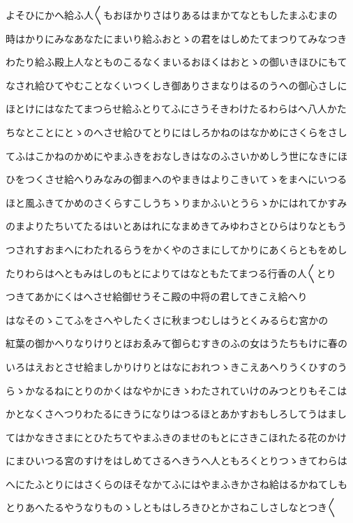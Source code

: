 \documentclass[a4paper,11pt,landscape]{ltjtarticle}
\begin{document}
よそひにかへ給ふ人〱もおほかりさはりあるはまかてなともしたまふむまの
\par\medskip
時はかりにみなあなたにまいり給ふおとゝの君をはしめたてまつりてみなつき
\par\medskip
わたり給ふ殿上人なとものこるなくまいるおほくはおとゝの御いきほひにもて
\par\medskip
なされ給ひてやむことなくいつくしき御ありさまなりはるのうへの御心さしに
\par\medskip
ほとけにはなたてまつらせ給ふとりてふにさうそきわけたるわらはへ八人かた
\par\medskip
ちなとことにとゝのへさせ給ひてとりにはしろかねのはなかめにさくらをさし
\par\medskip
てふはこかねのかめにやまふきをおなしきはなのふさいかめしう世になきにほ
\par\medskip
ひをつくさせ給へりみなみの御まへのやまきはよりこきいてゝをまへにいつる
\par\medskip
ほと風ふきてかめのさくらすこしうちゝりまかふいとうらゝかにはれてかすみ
\par\medskip
のまよりたちいてたるはいとあはれになまめきてみゆわさとひらはりなともう
\par\medskip
つされすおまへにわたれるらうをかくやのさまにしてかりにあくらともをめし
\par\medskip
たりわらはへともみはしのもとによりてはなともたてまつる行香の人〱とり
\par\medskip
つきてあかにくはへさせ給御せうそこ殿の中将の君してきこえ給へり
\par\medskip
はなそのゝこてふをさへやしたくさに秋まつむしはうとくみるらむ宮かの
\par\medskip
紅葉の御かへりなりけりとほおゑみて御らむすきのふの女はうたちもけに春の
\par\medskip
いろはえおとさせ給ましかりけりとはなにおれつゝきこえあへりうくひすのう
\par\medskip
らゝかなるねにとりのかくはなやかにきゝわたされていけのみつとりもそこは
\par\medskip
かとなくさへつりわたるにきうになりはつるほとあかすおもしろしてうはまし
\par\medskip
てはかなきさまにとひたちてやまふきのませのもとにさきこほれたる花のかけ
\par\medskip
にまひいつる宮のすけをはしめてさるへきうへ人ともろくとりつゝきてわらは
\par\medskip
へにたふとりにはさくらのほそなかてふにはやまふきかさね給はるかねてしも
\par\medskip
とりあへたるやうなりものゝしともはしろきひとかさねこしさしなとつき〱
\end{document}
